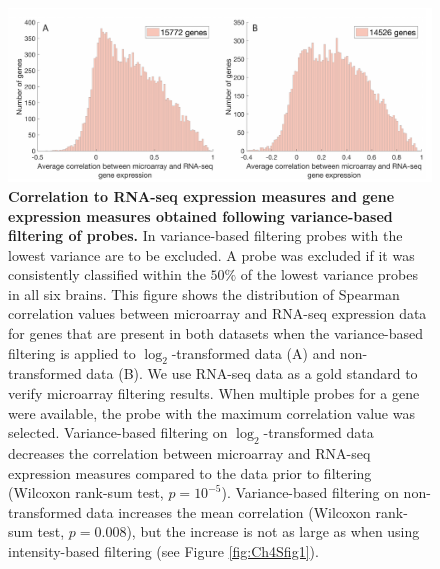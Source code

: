 \documentclass[10pt,A4]{article}
\begin{document}
\begin{figure}[h!]
  \centering
    \includegraphics[width=1\textwidth]{FigureS3.pdf}
\caption{\textbf{Correlation to RNA-seq expression measures and gene expression measures obtained following variance-based filtering of probes.}
In variance-based filtering probes with the lowest variance are to be excluded. A probe was excluded if it was consistently classified within the $50\%$ of the  lowest variance probes in all six brains. This figure shows the distribution of Spearman correlation values between microarray and RNA-seq expression data for genes that are present in both datasets when the variance-based filtering is applied to $\log_2$-transformed data (A) and non-transformed data (B). We use RNA-seq data as a gold standard to verify microarray filtering results. When multiple probes for a gene were available, the probe with the maximum correlation value was selected. Variance-based filtering on $\log_2$-transformed data decreases the correlation between microarray and RNA-seq expression measures compared to the data prior to filtering (Wilcoxon rank-sum test, $p = 10^{-5}$). Variance-based filtering on non-transformed data increases the mean correlation (Wilcoxon rank-sum test, $p = 0.008$), but the increase is not as large as when using intensity-based filtering (see Figure \ref{fig:Ch4Sfig1}).}
\label{fig:Ch4Sfig3}
\end{figure}
\end{document}

